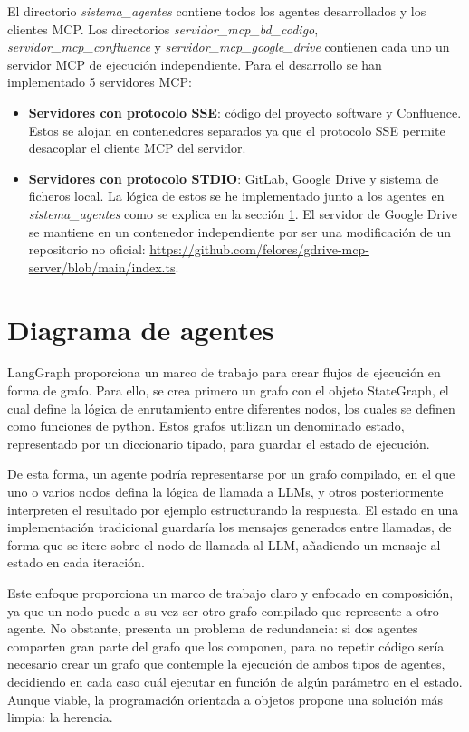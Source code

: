 El directorio \textit{sistema\_agentes} contiene todos los agentes desarrollados y los clientes MCP. Los directorios \textit{servidor\_mcp\_bd\_codigo}, \textit{servidor\_mcp\_confluence} y \textit{servidor\_mcp\_google\_drive} contienen cada uno un servidor MCP de ejecución independiente. Para el desarrollo se han implementado 5 servidores MCP:

\begin{itemize}
\item \textbf{Servidores con protocolo SSE}: código del proyecto software y Confluence. Estos se alojan en contenedores separados ya que el protocolo SSE permite desacoplar el cliente MCP del servidor.

\item \textbf{Servidores con protocolo STDIO}: GitLab, Google Drive y sistema de ficheros local. La lógica de estos se he implementado junto a los agentes en \textit{sistema\_agentes} como se explica en la sección \ref{}. El servidor de Google Drive se mantiene en un contenedor independiente por ser una modificación de un repositorio no oficial: \url{https://github.com/felores/gdrive-mcp-server/blob/main/index.ts}.
\end{itemize}

\section{Diagrama de agentes}

LangGraph proporciona un marco de trabajo para crear flujos de ejecución en forma de grafo. Para ello, se crea primero un grafo con el objeto StateGraph, el cual define la lógica de enrutamiento entre diferentes nodos, los cuales se definen como funciones de python. Estos grafos utilizan un denominado estado, representado por un diccionario tipado, para guardar el estado de ejecución.

De esta forma, un agente podría representarse por un grafo compilado, en el que uno o varios nodos defina la lógica de llamada a LLMs, y otros posteriormente interpreten el resultado por ejemplo estructurando la respuesta. El estado en una implementación tradicional guardaría los mensajes generados entre llamadas, de forma que se itere sobre el nodo de llamada al LLM, añadiendo un mensaje al estado en cada iteración. 

Este enfoque proporciona un marco de trabajo claro y enfocado en composición, ya que un nodo puede a su vez ser otro grafo compilado que represente a otro agente. No obstante, presenta un problema de redundancia: si dos agentes comparten gran parte del grafo que los componen, para no repetir código sería necesario crear un grafo que contemple la ejecución de ambos tipos de agentes, decidiendo en cada caso cuál ejecutar en función de algún parámetro en el estado. Aunque viable, la programación orientada a objetos propone una solución más limpia: la herencia. 

